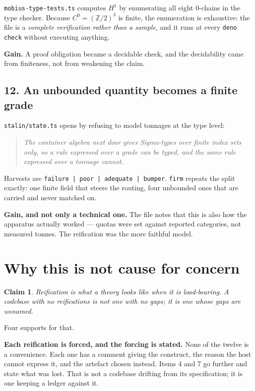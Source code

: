 \documentclass[11pt,a4paper]{article}
\newtheorem*{claim}{Claim}
\begin{document}
\texttt{mobius-type-tests.ts} computes $H^1$ by enumerating all eight
0-chains in the type checker. Because $C^0 = (\mathbb{Z}/2)^3$ is finite, the
enumeration is exhaustive: the file is a \emph{complete verification rather than
a sample}, and it runs at every \texttt{deno check} without executing anything.

\textbf{Gain.} A proof obligation became a decidable check, and the decidability
came from finiteness, not from weakening the claim.

\subsection*{12. An unbounded quantity becomes a finite grade}

\texttt{stalin/state.ts} opens by refusing to model tonnages at the type level:

\begin{quote}
\emph{The container algebra next door gives Sigma-types over finite index sets
only, so a rule expressed over a grade can be typed, and the same rule expressed
over a tonnage cannot.}
\end{quote}

Harvests are \texttt{failure | poor | adequate | bumper}. \texttt{firm} repeats
the split exactly: one finite field that steers the routing, four unbounded ones
that are carried and never matched on.

\textbf{Gain, and not only a technical one.} The file notes that this is also
how the apparatus actually worked --- quotas were set against reported
categories, not measured tonnes. The reification was the more faithful model.

\section{Why this is not cause for concern}

\begin{claim}
Reification is what a theory looks like when it is load-bearing. A codebase with
no reifications is not one with no gaps; it is one whose gaps are unnamed.
\end{claim}

Four supports for that.

\textbf{Each reification is forced, and the forcing is stated.} None of the
twelve is a convenience. Each one has a comment giving the construct, the reason
the host cannot express it, and the artefact chosen instead. Items 4 and 7 go
further and state what was lost. That is not a codebase drifting from its
specification; it is one keeping a ledger against it.
\end{document}
